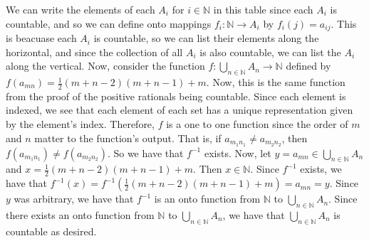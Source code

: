 \documentclass[12pt]{article}
\begin{document}
\begin{enumerate}
We can write the elements of each $A_i$ for $i\in\mathbb{N}$ in this table since each $A_i$ is countable, and so we can define onto mappings $f_i:\mathbb{N}\rightarrow A_i$ by $f_i(j)=a_{ij}$. This is beacuase each $A_i$ is countable, so we can list their elements along the horizontal, and since the collection of all $A_i$ is also countable, we can list the $A_i$ along the vertical. Now, consider the function $f:\bigcup_{n\in\mathbb{N}}A_n\rightarrow\mathbb{N}$ defined by $f(a_{mn})=\frac12(m+n-2)(m+n-1)+m$. Now, this is the same function from the proof of the positive rationals being countable. Since each element is indexed, we see that each element of each set has a unique representation given by the element's index. Therefore, $f$ is a one to one function since the order of $m$ and $n$ matter to the function's output. That is, if $a_{m_1n_1}\neq a_{m_2n_2}$, then $f(a_{m_1n_1})\neq f(a_{m_2n_2})$. So we have that $f^{-1}$ exists. Now, let $y=a_{mn}\in\bigcup_{n\in\mathbb{N}}A_n$ and $x=\frac12(m+n-2)(m+n-1)+m$. Then $x\in\mathbb{N}$. Since $f^{-1}$ exists, we have that $f^{-1}(x)=f^{-1}(\frac12(m+n-2)(m+n-1)+m)=a_{mn}=y$. Since $y$ was arbitrary, we have that $f^{-1}$ is an onto function from $\mathbb{N}$ to $\bigcup_{n\in\mathbb{N}}A_n$. Since there exists an onto function from $\mathbb{N}$ to $\bigcup_{n\in\mathbb{N}}A_n$, we have that $\bigcup_{n\in\mathbb{N}}A_n$ is countable as desired.\\[20pt]


\end{enumerate}
\end{document}
